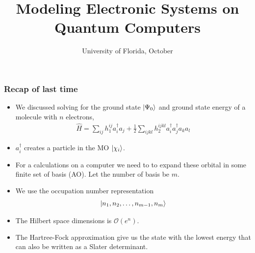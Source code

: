 \documentclass{beamer}
\title{Modeling Electronic Systems on Quantum Computers}
\date{University of Florida, October}
\newcommand{\mc}{\mathcal}
\renewcommand{\(}{\left(}
\renewcommand{\)}{\right)}
\renewcommand{\[}{\left[}
\renewcommand{\]}{\right]}
\begin{document}
\frame{\titlepage} 

\begin{frame}
    \frametitle{Recap of last time}
    \begin{itemize}
        \item We discussed solving for the ground state $\ket{\Psi_0}$ and ground state energy of a molecule with $n$ electrons, \begin{align*}
            \hat{H} = \sum_{ij} h_1^{ij} a^\dagger_i a_j + \frac{1}{2} \sum_{ijkl} h_2^{ijkl} a^\dagger_i a^\dagger_j a_k a_l
        \end{align*}
        \item $a^\dagger_i$ creates a particle in the MO $\ket{\chi_i}$.
        \item For a calculations on a computer we need to to expand these orbital in some finite set of basis (AO). Let the number of basis be $m$.
        \item We use the occupation number representation \begin{align*}
            \ket{n_1, n_2, \dots, n_{m-1}, n_m}
        \end{align*}
        \item The Hilbert space dimensions is $\mc O(e^{n})$. 
        \item The Hartree-Fock approximation give us the state with the lowest energy that can also be written as a Slater determinant.   
    \end{itemize}
    

\end{frame}

    
\end{document}
